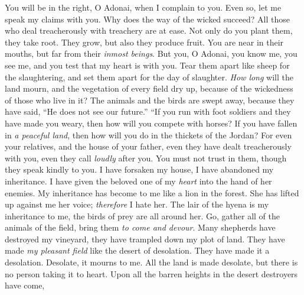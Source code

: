 \begin{biblechapter} %
 You will be in the right, O Adonai, when I complain to you. 
Even so, let me speak my claims with you. 
Why does the way of the wicked succeed? 
All those who deal treacherously with treachery are at ease.
\verse Not only do you plant them, they take root. 
They grow, but also they produce fruit. 
You are near in their mouths, 
but far from their \textit{inmost beings}.
\verse But you, O Adonai, you know me, 
you see me, and you test that my heart is with you. 
Tear them apart like sheep for the slaughtering, 
and set them apart for the day of slaughter.
\verse \textit{How long} will the land mourn, and the vegetation of every field dry up, 
because of the wickedness of those who live in it? 
The animals and the birds are swept away, 
because they have said, “He does not see our future.”
 “If you run with foot soldiers and they have made you weary, 
then how will you compete with horses? 
If you have fallen in \textit{a peaceful land}, 
then how will you do in the thickets of the Jordan?
\verse For even your relatives, and the house of your father, 
even they have dealt treacherously with you, 
even they call \textit{loudly} after you. 
You must not trust in them, though they speak kindly to you.
\verse I have forsaken my house, I have abandoned my inheritance. 
I have given the beloved one of my \textit{heart} into the hand of her enemies.
\verse My inheritance has become to me like a lion in the forest. 
She has lifted up against me her voice; \textit{therefore} I hate her.
\verse The lair of the hyena is my inheritance to me, 
the birds of prey are all around her. 
Go, gather all of the animals of the field, 
bring them \textit{to come and devour}.
\verse Many shepherds have destroyed my vineyard, 
they have trampled down my plot of land. 
They have made \textit{my pleasant field} 
like the desert of desolation.
\verse They have made it a desolation. 
Desolate, it mourns to me. 
All the land is made desolate, 
but there is no person taking it to heart.
\verse Upon all the barren heights in the desert destroyers have come, 

\end{biblechapter}
